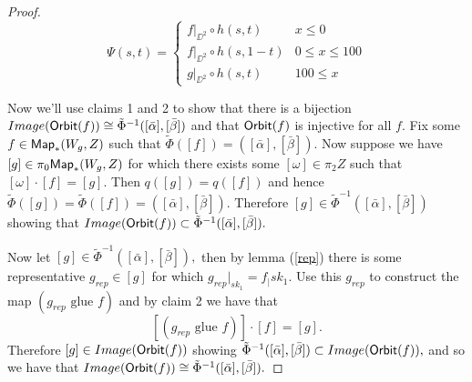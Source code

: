 \documentclass{amsart}
\theoremstyle{definition}
\theoremstyle{remark}
\begin{document}
\begin{proof}
\[ \Psi(s, t) =  \begin{cases} 
      f|_{\DD^{2}} \circ h(s, t) & x\leq 0 \\
      f|_{\DD^{2}} \circ h(s, 1 - t) & 0\leq x\leq 100 \\
      g|_{\DD^{2}} \circ h(s, t) & 100\leq x 
   \end{cases}
\]
\newline





\noindent Now we'll use claims 1 and 2 to show that there is a bijection $Image({\sf Orbit}(f)) \cong   \tilde{\Phi}^{-1}([\bar{\alpha}] ,[\bar{\beta}])$ and that ${\sf Orbit}(f)$ is injective for all $f$. \newline  \newline 
\noindent Fix some $f \in {\sf Map}_{\ast}(W_{g}, Z)$ such that $\tilde{\Phi}([f]) = ([\bar{\alpha}] ,[\bar{\beta}]).$ Now suppose we have $[g] \in \pi_{0}{\sf Map}_{\ast}(W_{g}, Z)$ for which there exists some $[\omega] \in \pi_{2}Z$ such that $[\omega] \cdot [f] = [g].$ Then $q([g]) = q([f])$ and hence $\tilde{\Phi}([g]) = \tilde{\Phi}([f]) = ([\bar{\alpha}] ,[\bar{\beta}]).$ Therefore $[g] \in \tilde{\Phi}^{-1}([\bar{\alpha}] ,[\bar{\beta}])$ showing that $Image({\sf Orbit}(f)) \subset \tilde{\Phi}^{-1}([\bar{\alpha}] ,[\bar{\beta}]).$ \newline


\noindent Now let $[g] \in \tilde{\Phi}^{-1}([\bar{\alpha}] , [\bar{\beta}]),$ then by lemma (\ref{rep}) there is some representative $g_{rep} \in [g]$ for which $g_{rep}|_{sk_{1}} = f_|{sk_{1}}.$ Use this $g_{rep}$ to construct the map $(g_{rep} \text{ glue } f)$ and by claim 2 we have that $$[(g_{rep}  \text{ glue } f)] \cdot [f]  = [g].$$ Therefore $[g] \in Image({\sf Orbit}(f))$ showing $\tilde{\Phi}^{-1}([\bar{\alpha}] ,[\bar{\beta}]) \subset Image({\sf Orbit}(f)),$ and so we have that $Image({\sf Orbit}(f)) \cong \tilde{\Phi}^{-1}([\bar{\alpha}] ,[\bar{\beta}]).$ 
\newline \newline


\end{proof}
\end{document}

